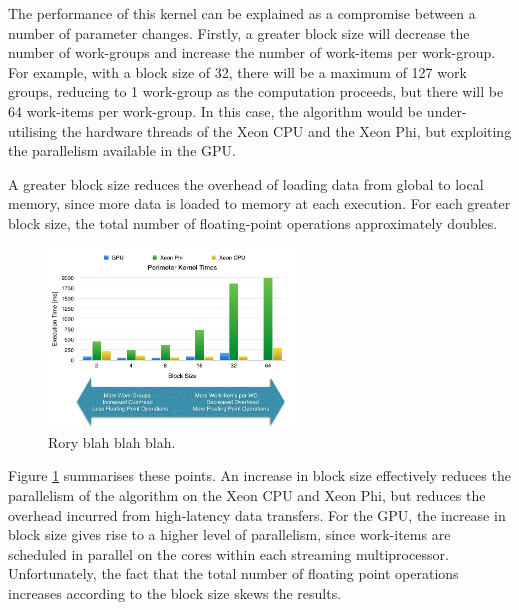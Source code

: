 \par{The performance of this kernel can be explained as a compromise between a number of parameter changes. 
    Firstly, a greater block size will decrease the number of work-groups and increase the number of work-items per work-group. 
    For example, with a block size of 32, there will be a maximum of 127 work groups, 
    reducing to 1 work-group as the computation proceeds, but there will be 64 work-items per work-group. 
    In this case, the algorithm would be under-utilising the hardware threads of the Xeon CPU and the Xeon Phi, 
    but exploiting the parallelism available in the GPU.}

\par{A greater block size reduces the overhead of loading data from global to local memory, 
    since more data is loaded to memory at each execution. For each greater block size, 
    the total number of floating-point operations approximately doubles.}

\begin{figure}[!h]
    \centering
    \includegraphics[width=0.6\textwidth]{figures/PerimeterKernel1.png}
    \caption{Rory blah blah blah.}
    \label{PerimeterKernel1}
\end{figure}

\par{Figure \ref{PerimeterKernel1} summarises these points. An increase in block size effectively 
    reduces the parallelism of the algorithm on the Xeon CPU and Xeon Phi, but reduces 
    the overhead incurred from high-latency data transfers. For the GPU, the increase 
    in block size gives rise to a higher level of parallelism, since work-items are scheduled 
    in parallel on the cores within each streaming multiprocessor. Unfortunately, the fact that the 
    total number of floating point operations increases according to the block size skews the results.}

